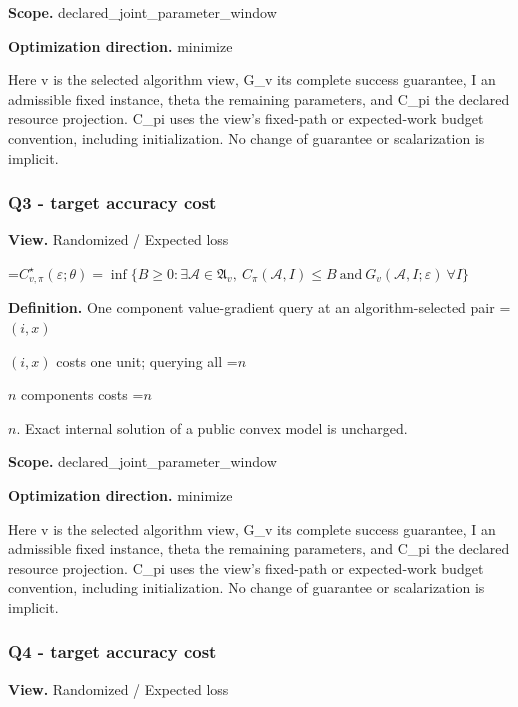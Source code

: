 \documentclass[10pt,a4paper]{article}
\newcommand{\AtlasMath}[1]{\par\begingroup\centering\setbox0=\hbox{$\displaystyle #1$}\ifdim\wd0>1.4\linewidth\typeout{ATLAS WIDE FORMULA: \the\wd0}\fi\ifdim\wd0>\linewidth\resizebox{\linewidth}{!}{\box0}\else\box0\fi\par\endgroup}
\newcommand{\AtlasInlineMath}[1]{\begingroup\setbox0=\hbox{$#1$}\ifdim\wd0>.4\linewidth\endgroup\AtlasMath{#1}\else\endgroup$#1$\fi}
\begin{document}
\textbf{Scope.} declared\_joint\_parameter\_window



\textbf{Optimization direction.} minimize



Here v is the selected algorithm view, G\_v its complete success guarantee, I an admissible fixed instance, theta the remaining parameters, and C\_pi the declared resource projection. C\_pi uses the view's fixed-path or expected-work budget convention, including initialization. No change of guarantee or scalarization is implicit.



\subsubsection{Q3 - target accuracy cost}


\textbf{View.} Randomized / Expected loss



\AtlasMath{C^\star_{v,\pi}(\varepsilon;\theta)=\inf\{B\ge0:\exists\mathcal A\in\mathfrak A_v,\ C_\pi(\mathcal A,I)\le B\ \text{and}\ G_v(\mathcal A,I;\varepsilon)\ \forall I\}}


\textbf{Definition.} One component value-gradient query at an algorithm-selected pair \AtlasInlineMath{(i,x)} costs one unit; querying all \AtlasInlineMath{n} components costs \AtlasInlineMath{n}. Exact internal solution of a public convex model is uncharged.



\textbf{Scope.} declared\_joint\_parameter\_window



\textbf{Optimization direction.} minimize



Here v is the selected algorithm view, G\_v its complete success guarantee, I an admissible fixed instance, theta the remaining parameters, and C\_pi the declared resource projection. C\_pi uses the view's fixed-path or expected-work budget convention, including initialization. No change of guarantee or scalarization is implicit.



\subsubsection{Q4 - target accuracy cost}


\textbf{View.} Randomized / Expected loss
\end{document}
